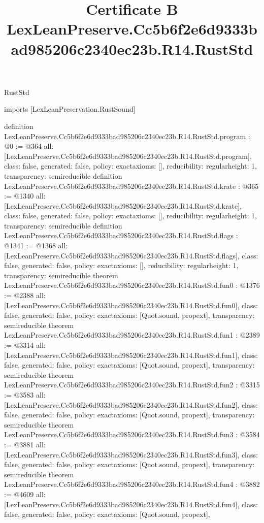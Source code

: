 \begin{lexlean}{RustStd}
\title{Certificate B LexLeanPreserve.Cc5b6f2e6d9333bad985206c2340ec23b.R14.RustStd}
\begin{coremodule}
imports [LexLeanPreservation.RustSound]

definition LexLeanPreserve.Cc5b6f2e6d9333bad985206c2340ec23b.R14.RustStd.program : @0 := @364 {
  all: [LexLeanPreserve.Cc5b6f2e6d9333bad985206c2340ec23b.R14.RustStd.program],
  class: false,
  generated: false,
  policy: exact{axioms: []},
  reducibility: regular{height: 1},
  transparency: semireducible
}
definition LexLeanPreserve.Cc5b6f2e6d9333bad985206c2340ec23b.R14.RustStd.krate : @365 := @1340 {
  all: [LexLeanPreserve.Cc5b6f2e6d9333bad985206c2340ec23b.R14.RustStd.krate],
  class: false,
  generated: false,
  policy: exact{axioms: []},
  reducibility: regular{height: 1},
  transparency: semireducible
}
definition LexLeanPreserve.Cc5b6f2e6d9333bad985206c2340ec23b.R14.RustStd.flags : @1341 := @1368 {
  all: [LexLeanPreserve.Cc5b6f2e6d9333bad985206c2340ec23b.R14.RustStd.flags],
  class: false,
  generated: false,
  policy: exact{axioms: []},
  reducibility: regular{height: 1},
  transparency: semireducible
}
theorem LexLeanPreserve.Cc5b6f2e6d9333bad985206c2340ec23b.R14.RustStd.fun0 : @1376 := @2388 {
  all: [LexLeanPreserve.Cc5b6f2e6d9333bad985206c2340ec23b.R14.RustStd.fun0],
  class: false,
  generated: false,
  policy: exact{axioms: [Quot.sound, propext]},
  transparency: semireducible
}
theorem LexLeanPreserve.Cc5b6f2e6d9333bad985206c2340ec23b.R14.RustStd.fun1 : @2389 := @3314 {
  all: [LexLeanPreserve.Cc5b6f2e6d9333bad985206c2340ec23b.R14.RustStd.fun1],
  class: false,
  generated: false,
  policy: exact{axioms: [Quot.sound, propext]},
  transparency: semireducible
}
theorem LexLeanPreserve.Cc5b6f2e6d9333bad985206c2340ec23b.R14.RustStd.fun2 : @3315 := @3583 {
  all: [LexLeanPreserve.Cc5b6f2e6d9333bad985206c2340ec23b.R14.RustStd.fun2],
  class: false,
  generated: false,
  policy: exact{axioms: [Quot.sound, propext]},
  transparency: semireducible
}
theorem LexLeanPreserve.Cc5b6f2e6d9333bad985206c2340ec23b.R14.RustStd.fun3 : @3584 := @3881 {
  all: [LexLeanPreserve.Cc5b6f2e6d9333bad985206c2340ec23b.R14.RustStd.fun3],
  class: false,
  generated: false,
  policy: exact{axioms: [Quot.sound, propext]},
  transparency: semireducible
}
theorem LexLeanPreserve.Cc5b6f2e6d9333bad985206c2340ec23b.R14.RustStd.fun4 : @3882 := @4609 {
  all: [LexLeanPreserve.Cc5b6f2e6d9333bad985206c2340ec23b.R14.RustStd.fun4],
  class: false,
  generated: false,
  policy: exact{axioms: [Quot.sound, propext]},
}
\end{coremodule}
\end{lexlean}
